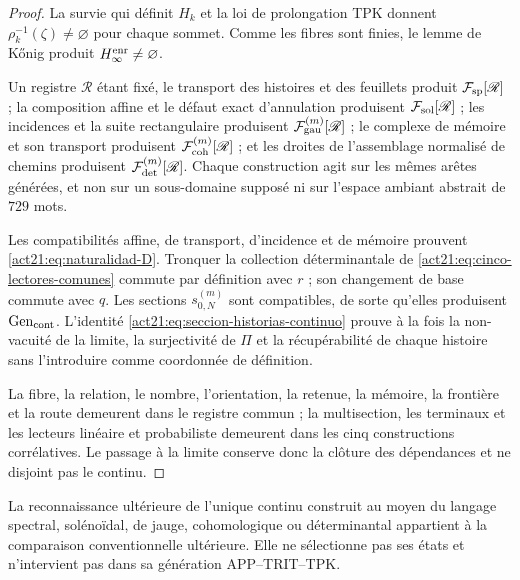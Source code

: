 \begin{proof}
La survie qui définit \(H_k\) et la loi de prolongation TPK donnent
\(\rho_k^{-1}(\zeta)\neq\varnothing\) pour chaque sommet. Comme les fibres sont
finies, le lemme de Kőnig produit \(H_\infty^{\rm enr}\neq\varnothing\).

Un registre \(\mathscr R\) étant fixé, le transport des histoires et des feuillets produit \(\mathcal F_{\rm sp}[\mathscr R]\) ; la composition affine et le défaut exact d'annulation produisent \(\mathcal F_{\rm sol}[\mathscr R]\) ; les incidences et la suite rectangulaire produisent \(\mathcal F_{\rm gau}^{(m)}[\mathscr R]\) ; le complexe de mémoire et son transport produisent \(\mathcal F_{\rm coh}^{(m)}[\mathscr R]\) ; et les droites de l'assemblage normalisé de chemins produisent \(\mathcal F_{\rm det}^{(m)}[\mathscr R]\). Chaque construction agit sur les mêmes arêtes générées, et non sur un sous-domaine supposé ni sur l'espace ambiant abstrait de \(729\) mots.

Les compatibilités affine, de transport, d’incidence et de mémoire prouvent
\eqref{act21:eq:naturalidad-D}. Tronquer la collection déterminantale de
\eqref{act21:eq:cinco-lectores-comunes} commute par
définition avec \(r\) ; son changement de base commute avec \(q\). Les sections
\(s_{0,N}^{(m)}\) sont compatibles, de sorte qu’elles produisent
\(\operatorname{Gen}_{\rm cont}\). L’identité
\eqref{act21:eq:seccion-historias-continuo} prouve à la fois la non-
vacuité de la limite, la surjectivité de \(\Pi\) et la récupérabilité de chaque
histoire sans l’introduire comme coordonnée de définition.


La fibre, la relation, le nombre, l'orientation, la retenue, la mémoire, la
frontière et la route demeurent dans le registre commun ; la multisection, les
terminaux et les lecteurs linéaire et probabiliste demeurent dans les cinq
constructions corrélatives. Le passage à la limite conserve donc la clôture des
dépendances et ne disjoint pas le continu.
\end{proof}

La reconnaissance ultérieure de l'unique continu construit au moyen du langage spectral, solénoïdal, de jauge, cohomologique ou déterminantal appartient à la comparaison conventionnelle ultérieure. Elle ne sélectionne pas ses états et n'intervient pas dans sa génération APP--TRIT--TPK.
